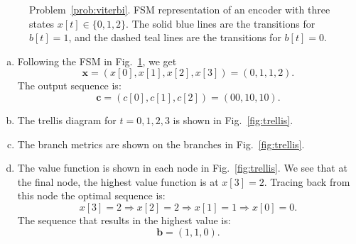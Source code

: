 \documentclass[11pt]{article}
\def\tp1{t\! + \! 1}
\newcommand{\bs}[1]{{\boldsymbol{{#1}}}}
\begin{document}
\begin{enumerate}
\begin{figure}
\caption{Problem~\ref{prob:viterbi}.
FSM representation of an encoder with three states
$x[t]\in \{0,1,2\}$.  
The solid blue lines are the transitions for $b[t]=1$,
and the dashed teal lines are the transitions for $b[t]=0$. 
}
\label{fig:threestate}
\end{figure}

\begin{solution}
\begin{enumerate}[(a)]
\item Following the FSM in Fig.~\ref{fig:threestate}, 
we get 
\[
    \bs{x} = (x[0],x[1],x[2],x[3]) = (0,1,1,2).
\]
The output sequence is:
\[
    \bs{c} = (c[0],c[1],c[2]) = (00,10,10).
\]

\item The trellis diagram for $t=0,1,2,3$ is shown in 
Fig.~\ref{fig:trellis}.

\item The branch metrics are shown on the branches in 
Fig.~\ref{fig:trellis}.

\item The value function is shown in each node in 
Fig.~\ref{fig:trellis}.  We see that at the final node, the
highest value function is at $x[3]=2$.
Tracing back from this node the optimal sequence is:
\[
    x[3] = 2 \Rightarrow x[2] = 2 \Rightarrow x[1] = 1 \Rightarrow x[0] = 0.
\]
The sequence that results in the highest value is:
\[
    \bs{b} = (1,1,0).
\]

\end{enumerate}

\end{solution}



\begin{figure}
\centering

\end{figure}
\end{enumerate}
\end{document}
